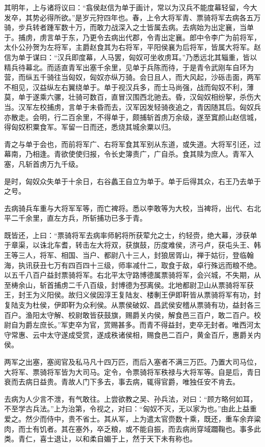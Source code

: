 \documentclass[]{article}
\begin{document}
其明年，上与诸将议曰：``翕侯赵信为单于画计，常以为汉兵不能度幕轻留，今大发卒，其势必得所欲。''是岁元狩四年也。春，上令大将军青、票骑将军去病各五万骑，步兵转者踵军数十万，而敢力战深入之士皆属去病。去病始为出定襄，当单于。捕虏，虏言单于东，乃更令去病出代郡，令青出定襄。郎中令李广为前将军，太仆公孙贺为左将军，主爵赵食其为右将军，平阳侯襄为后将军，皆属大将军。赵信为单于谋曰：``汉兵即度幕，人马罢，匈奴可坐收虏耳。''乃悉远北其辎重，皆以精兵待幕北。而适直青军出塞千余里，见单于兵陈而待，于是青令武刚车自环为营，而纵五千骑往当匈奴，匈奴亦纵万骑。会日且人，而大风起，沙砾击面，两军不相见，汉益纵左右翼绕单于。单于视汉兵多，而士马尚强，战而匈奴不利，薄莫，单于遂乘六骡，壮骑可数百，直冒汉围西北驰去。昏，汉匈奴相纷挐，杀伤大当。汉军左校捕虏，言单于未昏而去，汉军因发轻骑夜追之，青因随其后。匈奴兵亦散走。会明，行二百余里，不得单于，颇捕斩首虏万余级，遂至窴颜山赵信城，得匈奴积粟食军。军留一日而还，悉烧其城余粟以归。

青之与单于会也，而前将军广、右将军食其军别从东道，或失道。大将军引还，过幕南，乃相逢。青欲使使归报，令长史簿责广，广自杀。食其赎为庶人。青军入塞，凡斩首虏万九千级。

是时，匈奴众失单于十余日，右谷蠡王自立为单于。单于后得其众，右王乃去单于之号。

去病骑兵车重与大将军军等，而亡裨将。悉以李敢等为大校，当裨将，出代、右北平二千余里，直左方兵，所斩捕功已多于青。

既皆还，上曰：``票骑将军去病率师躬将所获荤允之士，约轻赍，绝大幕，涉获单于章渠，以诛北车耆，转击左大将双，获旗鼓，历度难侯，济弓卢，获屯头王、韩王等三人，将军、相国、当户、都尉八十三人，封狼居胥山，禅于姑衍，登临翰海，执讯获丑七万有四百四十三级，师率减什二，取食于敌，卓行殊远而粮不绝。以五千八百户益封票骑将军。右北平太守路博德属票骑将军，会兴城，不失期，从至梼余山，斩首捕虏二千八百级，封博德为邳离侯。北地都尉卫山从票骑将军获王，封王为义阳侯。故归义侯因淳王复陆友、楼剸王伊即靬皆从票骑将军有功，封复陆支为杜侯，伊即靬为众利侯。从票侯破奴、昌武侯安稽从票骑有功，益封各三百户。渔阳太守解、校尉敢皆获鼓旗，赐爵关内侯，解食邑三百户，敢二百户。校尉自为爵左庶长。''军吏卒为官，赏赐甚多。而青不得益封，吏卒无封者。唯西河太守常惠、云中太守遂成受赏，遂成秩诸侯相，赐食邑二百户，黄金百斤，惠爵关内侯。

两军之出塞，塞阅官及私马凡十四万匹，而后入塞者不满三万匹。乃置大司马位，大将军、票骑将军皆为大司马。定令，令票骑将军秩禄与大将军等。自是后，青日衰而去病日益贵。青故人门下多去，事去病，辄得官爵，唯独任安不肯去。

去病为人少言不泄，有气敢往。上尝欲教之吴、孙兵法，对曰：``顾方略何如耳，不至学古兵法。''上为治第，令视之，对曰：``匈奴不灭，无以家为也。''由此上益重爱之。然少而侍中，贵不省士。其从军，上为遣太官赍数十乘，既还，重车余弃粱肉，而士有饥者。其在塞外，卒乏粮，或不能自振，而去病尚穿域躢鞠也。事多此类。青仁，喜士退让，以和柔自媚于上，然于天下未有称也。
\end{document}
